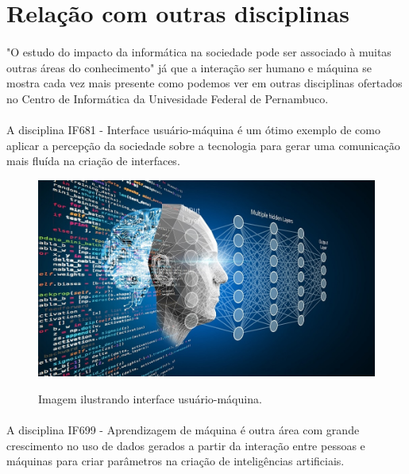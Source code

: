 \documentclass{article}
\begin{document}
\section{Relação com outras disciplinas}
\paragraph{} "O estudo do impacto da informática na sociedade pode ser associado à muitas outras áreas do conhecimento"\citep{Simon} já que a interação ser humano e máquina se mostra cada vez mais presente como podemos ver em outras disciplinas ofertados no Centro de Informática da Univesidade Federal de Pernambuco.

\paragraph{} A disciplina IF681 - Interface usuário-máquina é um ótimo exemplo de como aplicar a percepção da sociedade sobre a tecnologia para gerar uma comunicação mais fluída na criação de interfaces.
\begin{figure}[h!]
    \centering
    \includegraphics[scale = 0.17]{interface.jpg}
    \caption{Imagem ilustrando interface usuário-máquina.}\citep{interface}
    
\end{figure}

\paragraph{} A disciplina IF699 - Aprendizagem de máquina é outra área com grande crescimento no uso de dados gerados a partir da interação entre pessoas e máquinas para criar parâmetros na criação de inteligências artificiais.




\end{document}
